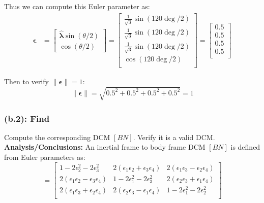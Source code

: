 \documentclass[titlepage]{article}
\begin{document}
\begin{mdframed}[linewidth=1pt, innertopmargin=10pt, innerbottommargin=10pt]
	Thus we can compute this Euler parameter as:
	\begin{equation}
		\begin{split}
			\boldsymbol{\epsilon}&=
			\begin{bmatrix}
				\hat{\boldsymbol{\lambda}}\sin(\theta/2) \\
				\cos(\theta/2)
			\end{bmatrix}=
			\begin{bmatrix}
				\frac{1}{\sqrt{3}}\sin(120\deg/2) \\
				\frac{1}{\sqrt{3}}\sin(120\deg/2) \\
				\frac{1}{\sqrt{3}}\sin(120\deg/2) \\
				\cos(120\deg/2) \\
			\end{bmatrix}=
			\begin{bmatrix}
				0.5 \\
				0.5 \\
				0.5 \\
				0.5 \\
			\end{bmatrix}
		\end{split}
	\end{equation}
	
	Then to verify $\|\boldsymbol{\epsilon}\|=1$:
	\begin{equation}
		\|\boldsymbol{\epsilon}\|=\sqrt{0.5^2+0.5^2+0.5^2+0.5^2}=1
	\end{equation}
\end{mdframed}

\subsubsection*{(b.2): Find}
Compute the corresponding DCM $[BN]$. Verify it is a valid DCM.\\

\textbf{Analysis/Conclusions:}
An inertial frame to body frame DCM $[BN]$ is defined from Euler parameters as:
\begin{equation}
	[BN]=
	\begin{bmatrix}
		1-2\epsilon_2^2-2\epsilon_3^2 & 2(\epsilon_1\epsilon_2+\epsilon_3\epsilon_4) & 2(\epsilon_1\epsilon_3-\epsilon_2\epsilon_4) \\
		2(\epsilon_1\epsilon_2-\epsilon_3\epsilon_4) & 1-2\epsilon_1^2-2\epsilon_3^2 & 2(\epsilon_2\epsilon_3+\epsilon_1\epsilon_4) \\
		2(\epsilon_1\epsilon_3+\epsilon_2\epsilon_4) & 2(\epsilon_2\epsilon_3-\epsilon_1\epsilon_4) & 1-2\epsilon_1^2-2\epsilon_2^2 \\
	\end{bmatrix}
\end{equation}
\end{document}
